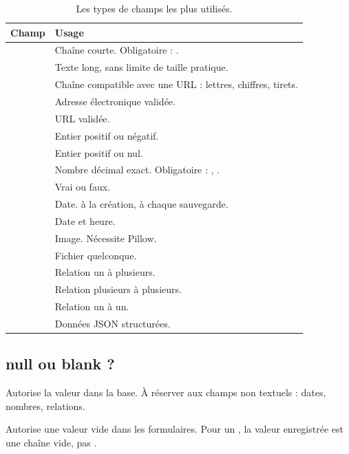 \begin{table}[htbp]
\centering
\small
\begin{tabularx}{\textwidth}{L{4.3cm} X}
\toprule
\textbf{Champ} & \textbf{Usage} \\
\midrule
{} & Chaîne courte. Obligatoire : . \\
 & Texte long, sans limite de taille pratique. \\
 & Chaîne compatible avec une URL : lettres, chiffres, tirets. \\
 & Adresse électronique validée. \\
 & URL validée. \\
 & Entier positif ou négatif. \\
 & Entier positif ou nul. \\
 & Nombre décimal exact. Obligatoire :
, . \\
 & Vrai ou faux. \\
 & Date.  à la création,
 à chaque sauvegarde. \\
 & Date et heure. \\
 & Image. Nécessite Pillow. \\
 & Fichier quelconque. \\
 & Relation un à plusieurs. \\
 & Relation plusieurs à plusieurs. \\
 & Relation un à un. \\
 & Données JSON structurées. \\
\bottomrule
\end{tabularx}
\caption{Les types de champs les plus utilisés.}
\end{table}

\subsection{null ou blank ?}

\begin{description}[leftmargin=2.7cm,style=nextline]
  \item[\code{null=True}] Autorise la valeur  dans la base. À réserver
  aux champs non textuels : dates, nombres, relations.
  \item[\code{blank=True}] Autorise une valeur vide dans les formulaires. Pour un
  , la valeur enregistrée est une chaîne vide, pas .
\end{description}

